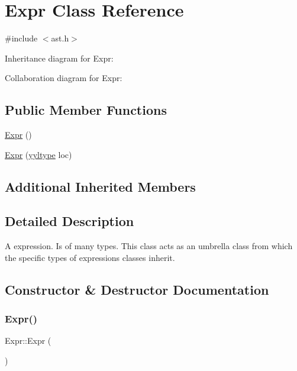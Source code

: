 \hypertarget{class_expr}{}\section{Expr Class Reference}
\label{class_expr}


{\ttfamily \#include $<$ast.\+h$>$}



Inheritance diagram for Expr\+:


Collaboration diagram for Expr\+:
\subsection*{Public Member Functions}
\begin{DoxyCompactItemize}
\item 
\hyperlink{class_expr_a1a9a7b59eb5ae1e849a334f3f824248f}{Expr} ()
\item 
\hyperlink{class_expr_ae45abbf50387f67dbc1a408816515e1f}{Expr} (\hyperlink{structyyltype}{yyltype} loc)
\end{DoxyCompactItemize}
\subsection*{Additional Inherited Members}


\subsection{Detailed Description}
A expression. Is of many types. This class acts as an umbrella class from which the specific types of expressions\textquotesingle{} classes inherit. 

\subsection{Constructor \& Destructor Documentation}
\mbox{\label{class_expr_a1a9a7b59eb5ae1e849a334f3f824248f}} 
\subsubsection{\texorpdfstring{Expr()}{Expr()}\hspace{0.1cm}{\footnotesize\ttfamily [1/2]}}
{\footnotesize\ttfamily Expr\+::\+Expr (\begin{DoxyParamCaption}{ }\end{DoxyParamCaption})\hspace{0.3cm}{\ttfamily [inline]}}

